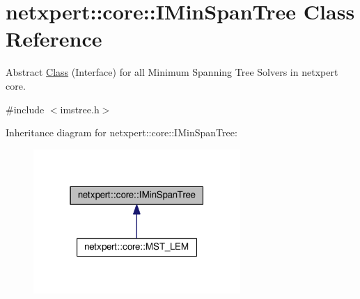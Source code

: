 \hypertarget{classnetxpert_1_1core_1_1IMinSpanTree}{}\section{netxpert\+:\+:core\+:\+:I\+Min\+Span\+Tree Class Reference}
\label{classnetxpert_1_1core_1_1IMinSpanTree}


Abstract \hyperlink{classClass}{Class} (Interface) for all Minimum Spanning Tree Solvers in netxpert core.  




{\ttfamily \#include $<$imstree.\+h$>$}



Inheritance diagram for netxpert\+:\+:core\+:\+:I\+Min\+Span\+Tree\+:\nopagebreak
\begin{figure}[H]
\begin{center}
\leavevmode
\includegraphics[width=223pt]{classnetxpert_1_1core_1_1IMinSpanTree__inherit__graph}
\end{center}
\end{figure}
